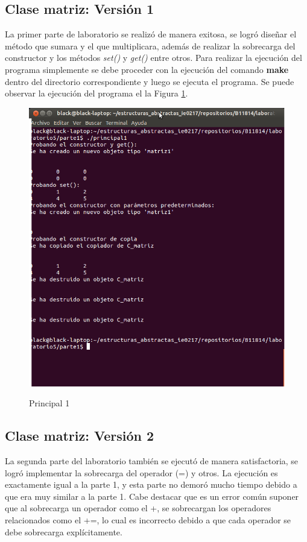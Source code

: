 \documentclass{article}
\begin{document}
\subsection{Clase matriz: Versi\' on 1}
La primer parte de laboratorio se realiz\' o de manera exitosa, se logr\' o dise\~ nar el m\' etodo que sumara y el que multiplicara, adem\' as de realizar la sobrecarga del constructor y los m\' etodos \textit{set()} y \textit{get()} entre otros.
Para realizar la ejecuci\' on del programa simplemente se debe proceder con la ejecuci\' on del comando \textbf{make} dentro del directorio correspondiente y luego se ejecuta el programa.
Se puede observar la ejecuci\' on del programa el la Figura \ref{fig:principal1}.
\begin{figure}[hbtp]
\caption{Principal 1}
\includegraphics[scale=0.4]{./imagenes/principal1.png}
\label{fig:principal1}
\end{figure}


\subsection{Clase matriz: Versi\' on 2}
La segunda parte del laboratorio tambi\' en se ejecut\' o de manera satisfactoria, se logr\' o implementar la sobrecarga del operador (=) y otros. La ejecuci\' on es exactamente igual a la parte 1, y esta parte no demor\' o mucho tiempo debido a que era muy similar a la parte 1. 
Cabe destacar que es un error com\' un suponer que al sobrecarga un operador como el +, se sobrecargan los operadores relacionados como el +=, lo cual es incorrecto debido a que cada operador se debe sobrecarga expl\' icitamente.
\end{document}
